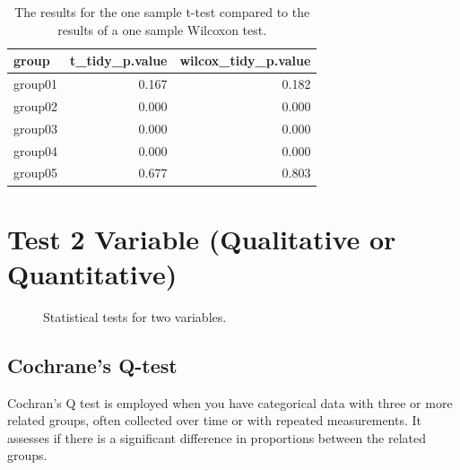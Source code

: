 \documentclass[
  a4paper,
]{scrbook}
\begin{document}
\begin{longtable}[]{@{}lrr@{}}

\caption{\label{tbl-wilcox-one-compare}The results for the one sample
t-test compared to the results of a one sample Wilcoxon test.}

\tabularnewline

\toprule\noalign{}
group & t\_tidy\_p.value & wilcox\_tidy\_p.value \\
\midrule\noalign{}
\endhead
\bottomrule\noalign{}
\endlastfoot
{group01} & 0.167 & 0.182 \\
{group02} & 0.000 & 0.000 \\
{group03} & 0.000 & 0.000 \\
{group04} & 0.000 & 0.000 \\
{group05} & 0.677 & 0.803 \\

\end{longtable}

\section{Test 2 Variable (Qualitative or
Quantitative)}\label{test-2-variable-qualitative-or-quantitative}

\begin{figure}[H]


\caption{\label{fig-tests-TwoVar-same}Statistical tests for two
variables.}

\end{figure}%

\subsection{Cochrane's Q-test}\label{cochranes-q-test}

Cochran's Q test is employed when you have categorical data with three
or more related groups, often collected over time or with repeated
measurements. It assesses if there is a significant difference in
proportions between the related groups.
\end{document}
